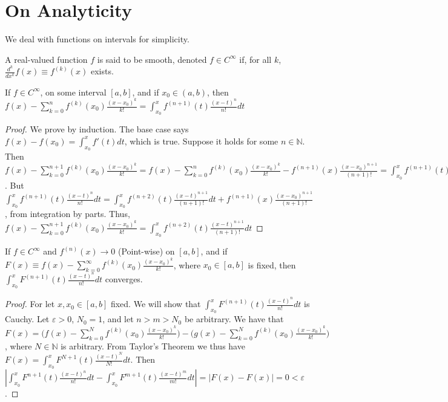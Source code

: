 \documentclass[crop=false,class=book]{standalone}
\begin{document}
\section{On Analyticity}
We deal with functions on intervals for simplicity.
\begin{definition}
A real-valued function $f$ is said to be smooth, denoted $f\in C^{\infty}$ if, for all $k$, $\frac{d^k}{dx^k}f(x) \equiv f^{(k)}(x)$ exists.
\end{definition}
\begin{theorem}
If $f\in C^{\infty}$, on some interval $[a,b]$, and if $x_0\in (a,b)$, then $f(x) - \sum_{k=0}^{n} f^{(k)}(x_0)\frac{(x-x_0)^k}{k!} = \int_{x_0}^{x} f^{(n+1)}(t)\frac{(x-t)^n}{n!}dt$
\end{theorem}
\begin{proof}
We prove by induction. The base case says $f(x)-f(x_0) = \int_{x_0}^{x} f'(t)dt$, which is true. Suppose it holds for some $n\in \mathbb{N}$. Then $f(x)-\sum_{k=0}^{n+1} f^{(k)}(x_0)\frac{(x-x_0)^k}{k!} = f(x)-\sum_{k=0}^{n} f^{(k)}(x_0)\frac{(x-x_0)^k}{k!} - f^{(n+1)}(x)\frac{(x-x_0)^{n+1}}{(n+1)!} = \int_{x_0}^{x} f^{(n+1)}(t)\frac{(x-t)^n}{n!}dt - f^{(n+1)}(x)\frac{(x-x_0)^{n+1}}{(n+1)!}$. But $\int_{x_0}^{x} f^{(n+1)}(t)\frac{(x-t)^n}{n!}dt =  \int_{x_0}^{x} f^{(n+2)}(t) \frac{(x-t)^{n+1}}{(n+1)!} dt + f^{(n+1)}(x)\frac{(x-x_0)^{n+1}}{(n+1)!}$, from integration by parts. Thus, $f(x)-\sum_{k=0}^{n+1} f^{(k)}(x_0)\frac{(x-x_0)^k}{k!}= \int_{x_0}^{x} f^{(n+2)}(t) \frac{(x-t)^{n+1}}{(n+1)!} dt$
\end{proof}
\begin{lemma}
If $f\in C^{\infty}$ and $f^{(n)}(x)\rightarrow 0$ (Point-wise) on $[a,b]$, and if $F(x) \equiv f(x)-\sum_{k=0}^{\infty} f^{(k)}(x_0)\frac{(x-x_0)^{k}}{k!}$, where $x_0\in [a,b]$ is fixed, then $\int_{x_0}^{x} F^{(n+1)}(t)\frac{(x-t)^{n}}{n!}dt$ converges. 
\end{lemma}
\begin{proof}
For let $x,x_0\in [a,b]$ fixed. We will show that $\int_{x_0}^{x} F^{(n+1)}(t)\frac{(x-t)^{n}}{n!}dt$ is Cauchy. Let $\varepsilon>0$, $N_0 = 1$, and let $n>m>N_0$ be arbitrary. We have that $F(x) = \bigg(f(x)-\sum_{k=0}^{N} f^{(k)}(x_0)\frac{(x-x_0)^{k}}{k!}\bigg)-\bigg(g(x)-\sum_{k=0}^{N} f^{(k)}(x_0)\frac{(x-x_0)^{k}}{k!}\bigg)$, where $N\in \mathbb{N}$ is arbitrary. From Taylor's Theorem we thus have $F(x) = \int_{x_0}^{x}F^{N+1}(t)\frac{(x-t)^N}{N!}dt$. Then $|\int_{x_0}^{x}F^{n+1}(t)\frac{(x-t)^n}{n!}dt-\int_{x_0}^{x}F^{m+1}(t)\frac{(x-t)^m}{m!}dt| = |F(x)-F(x)|= 0 <\varepsilon$. 
\end{proof}
\end{document}
